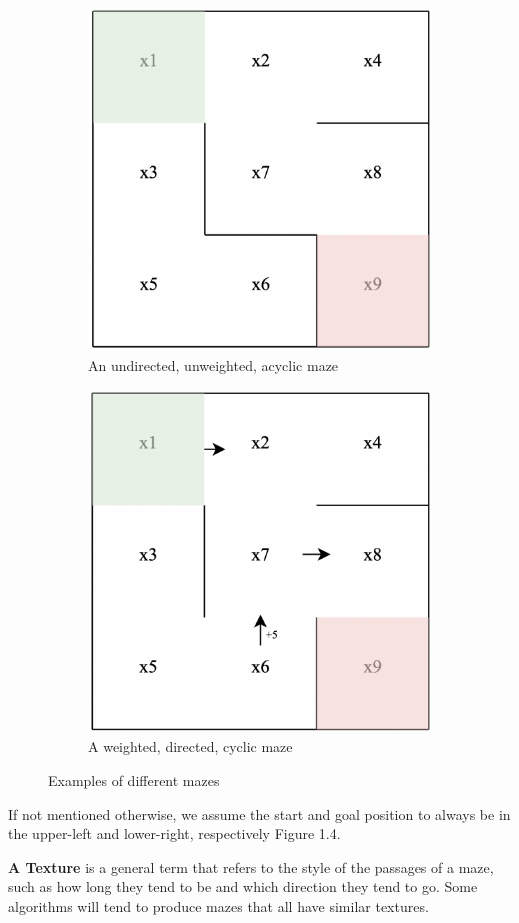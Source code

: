 \newline
 \begin{figure}[!h]
	\centering
	\begin{subfigure}{.45\textwidth}
	  \centering
	  \includegraphics[width=.6\linewidth]{undirected_maze}
	  \caption{An undirected, unweighted, acyclic maze}
	  \label{fig:sub1}
	\end{subfigure}
	\begin{subfigure}{.45\textwidth}
	  \centering
	  \includegraphics[width=.6\linewidth]{cyclic_maze}
	  \caption{A weighted, directed, cyclic maze}
	  \label{fig:sub2}
	\end{subfigure}
	\caption{Examples of different mazes}
	\label{fig:test}
	\end{figure}
	\newline
If not mentioned otherwise, we assume the start and goal position to always be in the upper-left and lower-right, respectively Figure 1.4.
\newline	
 \begin{definition}\textbf{A Texture} is a general term that refers to the style of the passages of a maze, such as how long they tend to be and which direction they tend to go. Some algorithms will tend to produce mazes that all have similar textures.\cite{mazes}\end{definition}

